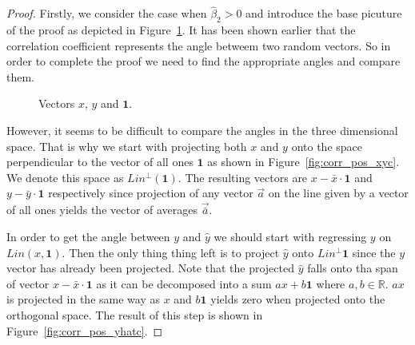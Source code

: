\documentclass[nobib]{tufte-handout}
\theoremstyle{definition}
\begin{document}
\begin{proof}
Firstly, we consider the case when $\hat \beta_2 > 0$ and introduce the base
picuture of the proof as depicted in Figure~\ref{fig:corr_pos_base}.
It has been shown earlier that the correlation coefficient represents the angle
betweem two random vectors.
So in order to complete the proof we need to find the appropriate angles and compare them.

\begin{figure}[h!]
\caption{Vectors $x$, $y$ and $\mathbf{1}$.}
\label{fig:corr_pos_base}
\end{figure}

However, it seems to be difficult to compare the angles in the three dimensional space.
That is why we start with projecting both $x$ and $y$ onto the space perpendicular to the vector of all ones $\mathbf{1}$ as shown in Figure~\ref{fig:corr_pos_xyc}.
We denote this space as $Lin^{\perp}(\mathbf{1})$. The resulting vectors are $x - \bar x \cdot \mathbf{1}$  and $y - \bar y \cdot \mathbf{1}$ respectively
since projection of any vector $\vec{a}$ on the line given by a vector of all ones yields the vector of averages $\vec{\bar a}$.

In order to get the angle between $y$ and $\hat y$ we should start with regressing $y$ on $Lin(x, \mathbf{1})$.
Then the only thing thing left is to project $\hat y$ onto $Lin^{\perp}\mathbf{1}$ since the $y$ vector has already been projected.
Note that the projected $\hat y$ falls onto tha span of vector $x - \bar x \cdot \mathbf{1}$ as it can be decomposed into a sum $a x + b \mathbf{1}$ where $a, b \in \mathbb{R}$.
$a x$ is projected in the same way as $x$ and $b \mathbf{1}$ yields zero when projected onto the orthogonal space.
The result of this step is shown in Figure~\ref{fig:corr_pos_yhatc}.


\end{proof}
\end{document}
